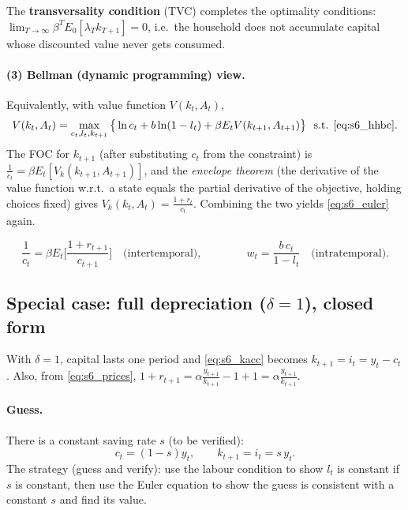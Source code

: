 The \textbf{transversality condition} (TVC) completes the optimality conditions: $\lim_{T\to\infty}\beta^TE_0[\lambda_Tk_{T+1}]=0$, i.e.\ the household does not accumulate capital whose discounted value never gets consumed.

\paragraph{(3) Bellman (dynamic programming) view.} Equivalently, with value function $V(k_t,A_t)$,
\[
V(k_t,A_t)=\max_{c_t,l_t,k_{t+1}}\big\{\ln c_t+b\ln(1-l_t)+\beta E_tV(k_{t+1},A_{t+1})\big\}\ \ \text{s.t. \eqref{eq:s6_hhbc}}.
\]
The FOC for $k_{t+1}$ (after substituting $c_t$ from the constraint) is $\frac1{c_t}=\beta E_t[V_k(k_{t+1},A_{t+1})]$, and the \emph{envelope theorem} (the derivative of the value function w.r.t.\ a state equals the partial derivative of the objective, holding choices fixed) gives $V_k(k_t,A_t)=\frac{1+r_t}{c_t}$. Combining the two yields \eqref{eq:s6_euler} again.

\begin{keybox}[title=Two household optimality conditions]
\[
\frac1{c_t}=\beta E_t\Big[\frac{1+r_{t+1}}{c_{t+1}}\Big]\quad\text{(intertemporal)},\qquad\qquad w_t=\frac{b\,c_t}{1-l_t}\quad\text{(intratemporal)}.
\]
\end{keybox}

\subsection{Special case: full depreciation ($\delta=1$), closed form }

With $\delta=1$, capital lasts one period and \eqref{eq:s6_kacc} becomes $k_{t+1}=i_t=y_t-c_t$. Also, from \eqref{eq:s6_prices}, $1+r_{t+1}=\alpha\frac{y_{t+1}}{k_{t+1}}-1+1=\alpha\frac{y_{t+1}}{k_{t+1}}$.

\paragraph{Guess.} There is a constant saving rate $s$ (to be verified):
\[
c_t=(1-s)y_t,\qquad k_{t+1}=i_t=s\,y_t .
\]
The strategy (guess and verify): use the labour condition to show $l_t$ is constant if $s$ is constant, then use the Euler equation to show the guess is consistent with a constant $s$ and find its value.

